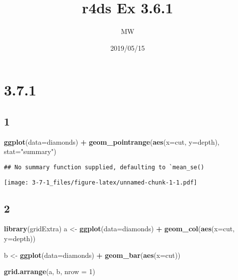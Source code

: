 \documentclass[]{article}
\title{r4ds Ex 3.6.1}
\author{MW}
\date{2019/05/15}
\newenvironment{Shaded}{\begin{snugshade}}{\end{snugshade}}
\newcommand{\DataTypeTok}[1]{\textcolor[rgb]{0.13,0.29,0.53}{#1}}
\newcommand{\DecValTok}[1]{\textcolor[rgb]{0.00,0.00,0.81}{#1}}
\newcommand{\KeywordTok}[1]{\textcolor[rgb]{0.13,0.29,0.53}{\textbf{#1}}}
\newcommand{\NormalTok}[1]{#1}
\newcommand{\OperatorTok}[1]{\textcolor[rgb]{0.81,0.36,0.00}{\textbf{#1}}}
\newcommand{\StringTok}[1]{\textcolor[rgb]{0.31,0.60,0.02}{#1}}
\begin{document}
\maketitle

\hypertarget{section}{%
\section{3.7.1}\label{section}}

\hypertarget{section-1}{%
\subsection{1}\label{section-1}}

\begin{Shaded}
\begin{Highlighting}[]
\KeywordTok{ggplot}\NormalTok{(}\DataTypeTok{data=}\NormalTok{diamonds) }\OperatorTok{+}
\StringTok{    }\KeywordTok{geom_pointrange}\NormalTok{(}\KeywordTok{aes}\NormalTok{(}\DataTypeTok{x=}\NormalTok{cut, }\DataTypeTok{y=}\NormalTok{depth), }\DataTypeTok{stat=}\StringTok{"summary"}\NormalTok{)}
\end{Highlighting}
\end{Shaded}

\begin{verbatim}
## No summary function supplied, defaulting to `mean_se()
\end{verbatim}

\texttt{[image: 3-7-1\_files/figure-latex/unnamed-chunk-1-1.pdf]}

\hypertarget{section-2}{%
\subsection{2}\label{section-2}}

\begin{Shaded}
\begin{Highlighting}[]
\KeywordTok{library}\NormalTok{(gridExtra)}
\NormalTok{a <-}\StringTok{ }\KeywordTok{ggplot}\NormalTok{(}\DataTypeTok{data=}\NormalTok{diamonds) }\OperatorTok{+}
\StringTok{    }\KeywordTok{geom_col}\NormalTok{(}\KeywordTok{aes}\NormalTok{(}\DataTypeTok{x=}\NormalTok{cut, }\DataTypeTok{y=}\NormalTok{depth))}

\NormalTok{b <-}\StringTok{ }\KeywordTok{ggplot}\NormalTok{(}\DataTypeTok{data=}\NormalTok{diamonds) }\OperatorTok{+}
\StringTok{    }\KeywordTok{geom_bar}\NormalTok{(}\KeywordTok{aes}\NormalTok{(}\DataTypeTok{x=}\NormalTok{cut))}

\KeywordTok{grid.arrange}\NormalTok{(a, b, }\DataTypeTok{nrow =} \DecValTok{1}\NormalTok{)}
\end{Highlighting}
\end{Shaded}
\end{document}
